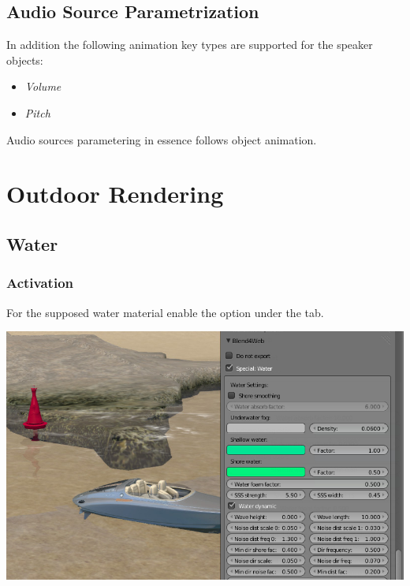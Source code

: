 \documentclass[a4paper,12pt,oneside]{sphinxmanual}
\begin{document}
\section{Audio Source Parametrization}
\label{animation:id6}
In addition the following animation key types are supported for the speaker objects:
\begin{itemize}
\item {} 
\emph{Volume}

\item {} 
\emph{Pitch}

\end{itemize}

Audio sources parametering in essence follows object animation.


\chapter{Outdoor Rendering}
\label{outdoor_rendering:outdoor-rendering}\label{outdoor_rendering::doc}\label{outdoor_rendering:id1}

\section{Water}
\label{outdoor_rendering:id2}

\subsection{Activation}
\label{outdoor_rendering:id3}
For the supposed water material enable the  option under the  tab.

{\hfill\includegraphics[width=1.000\linewidth]{water_material_setup.jpg}\hfill}
\end{document}
